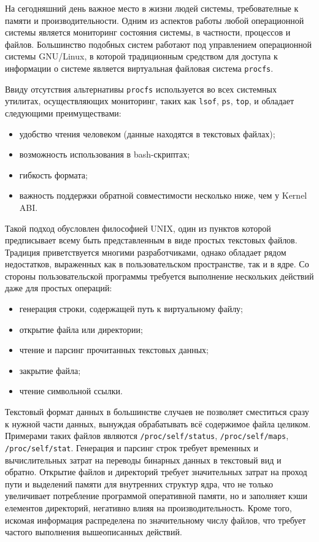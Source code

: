 \label{sec:intro}
На сегодняшний день важное место в жизни людей системы, требователные к памяти и
производительности. Одним из аспектов работы любой операционной системы является
мониторинг состояния системы, в частности, процессов и файлов. Большинство
подобных систем работают под управлением операционной системы GNU/Linux, в
которой традиционным средством для доступа к информации о системе является
виртуальная файловая система \texttt{procfs}.

Ввиду отсутствия альтернативы \texttt{procfs} используется во всех системных
утилитах, осуществляющих мониторинг, таких как \texttt{lsof}, \texttt{ps},
\texttt{top}, и обладает следующими преимуществами:

\begin{itemize}
\item удобство чтения человеком (данные находятся в текстовых файлах);
\item возможность использования в bash-скриптах;
\item гибкость формата;
\item важность поддержки обратной совместимости несколько ниже, чем у Kernel ABI.
\end{itemize}

Такой подход обусловлен философией UNIX, один из пунктов которой предписывает
всему быть представленным в виде простых текстовых файлов. Традиция приветствуется
многими  разработчиками,
однако обладает рядом недостатков, выраженных как в пользовательском
пространстве, так и в ядре. Со стороны пользовательской программы требуется
выполнение нескольких действий даже для простых операций:

\begin{itemize}
\item генерация строки, содержащей путь к виртуальному файлу;
\item открытие файла или директории;
\item чтение и парсинг прочитанных текстовых данных;
\item закрытие файла;
\item чтение символьной ссылки.
\end{itemize}

Текстовый формат данных в большинстве случаев не позволяет сместиться сразу к
нужной части данных, вынуждая обрабатывать всё содержимое файла целиком.
Примерами таких файлов являются \texttt{/proc/self/status},
\texttt{/proc/self/maps}, \texttt{/proc/self/stat}.
Генерация и парсинг строк требует временных и вычислительных затрат на переводы
бинарных данных в текстовый вид и обратно. Открытие файлов и директорий требует
значительных затрат на проход пути и выделений памяти для внутренних структур
ядра, что не только увеличивает потребление программой оперативной памяти, но и
заполняет кэши елементов директорий, негативно влияя на производительность.
Кроме того, искомая информация распределена по значительному числу файлов, что
требует частого выполнения вышеописанных действий.

